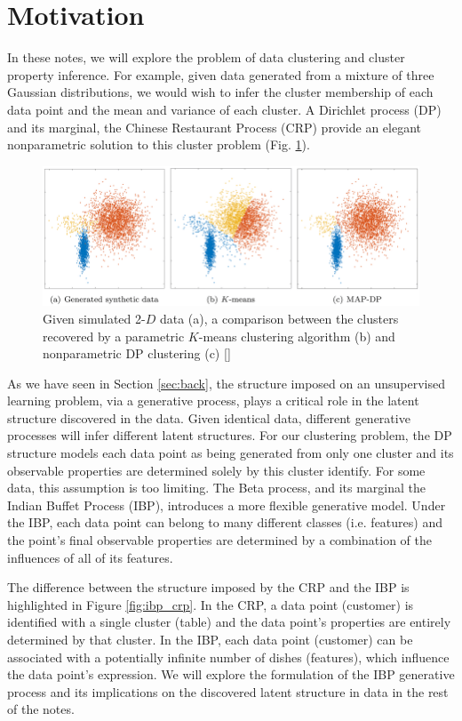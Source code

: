 \documentclass[twoside]{article}
\begin{document}
\section{Motivation}
In these notes, we will explore the problem of data clustering and cluster property inference. For example, given data generated from a mixture of three Gaussian distributions, we would wish to infer the cluster membership of each data point and the mean and variance of each cluster. A Dirichlet process (DP) and its marginal, the Chinese Restaurant Process (CRP) provide an elegant nonparametric solution to this cluster problem (Fig. \ref{fig:cluster}). 

\begin{figure}[h]
  \centering
    \includegraphics[scale=0.35]{cluster}
    \caption{Given simulated 2-$D$ data (a), a comparison between the clusters recovered by a parametric $K$-means clustering algorithm (b) and nonparametric DP clustering (c) [\citet{Raykov2016}]}
  \label{fig:cluster}
\end{figure}

As we have seen in Section \ref{sec:back}, the structure imposed on an unsupervised learning problem, via a generative process, plays a critical role in the latent structure discovered in the data. Given identical data, different generative processes will infer different latent structures. For our clustering problem, the DP structure models each data point as being generated from only one cluster and its observable properties are determined solely by this cluster identify. For some data, this assumption is too limiting.  The Beta process, and its marginal the Indian Buffet Process (IBP), introduces a more flexible generative model. Under the IBP, each data point can belong to many different classes (i.e. features) and the point's final observable properties are determined by a combination of the influences of all of its features.  

The difference between the structure imposed by the CRP and the IBP is highlighted in Figure \ref{fig:ibp_crp}. In the CRP, a data point (customer) is identified with a single cluster (table) and the data point's properties are entirely determined by that cluster. In the IBP, each data point (customer) can be associated with a potentially infinite number of dishes (features), which influence the data point's expression. We will explore the formulation of the IBP generative process and its implications on the discovered latent structure in data in the rest of the notes.
\end{document}
